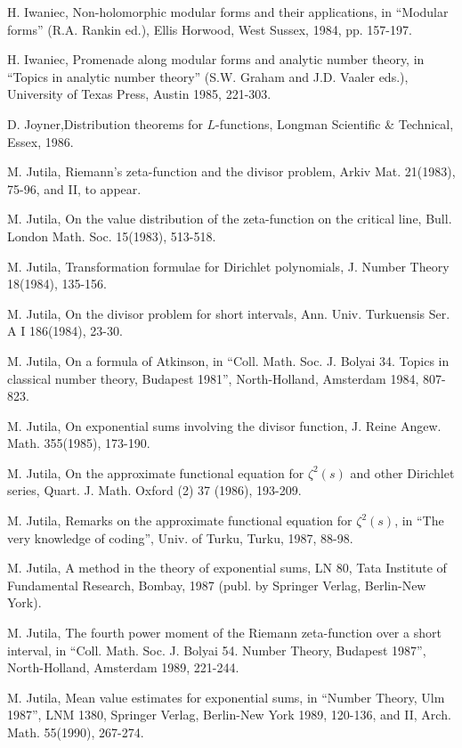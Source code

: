 \begin{thebibliography}{99}
 H. Iwaniec, Non-holomorphic modular forms and their applications, in ``Modular forms'' (R.A. Rankin ed.), Ellis Horwood, West Sussex, 1984, pp. 157-197.

 H. Iwaniec, Promenade along modular forms and analytic number theory, in ``Topics in analytic number theory'' (S.W. Graham and J.D. Vaaler eds.), University of Texas Press, Austin 1985, 221-303.

 D. Joyner,\pageoriginale Distribution theorems for $L$-functions, Longman Scientific \& Technical, Essex, 1986.

 M. Jutila, Riemann's zeta-function and the divisor problem, Arkiv Mat. 21(1983), 75-96, and II, to appear. 

 M. Jutila, On the value distribution of the zeta-function on the critical line, Bull. London Math. Soc. 15(1983), 513-518.

 M. Jutila, Transformation formulae for Dirichlet polynomials, J. Number Theory 18(1984), 135-156.

 M. Jutila, On the divisor problem for short intervals, Ann. Univ. Turkuensis Ser. A I 186(1984), 23-30.

 M. Jutila, On a formula of Atkinson, in ``Coll. Math. Soc. J. Bolyai 34. Topics in classical number theory, Budapest 1981'', North-Holland, Amsterdam 1984, 807-823.

 M. Jutila, On exponential sums involving the divisor function, J. Reine Angew. Math. 355(1985), 173-190.

 M. Jutila, On the approximate functional equation for $\zeta^2(s)$ and other Dirichlet series, Quart. J. Math. Oxford (2) 37 (1986), 193-209.

 M. Jutila, Remarks on the approximate functional equation for $\zeta^2(s)$, in ``The very knowledge of coding'', Univ. of Turku, Turku, 1987, 88-98.

 M. Jutila, A method in the theory of exponential sums, LN 80, Tata Institute of Fundamental Research, Bombay, 1987 (publ. by Springer Verlag, Berlin-New York).

 M. Jutila, The fourth power moment of the Riemann zeta-function over a short interval, in ``Coll. Math. Soc. J. Bolyai 54. Number Theory, Budapest 1987'', North-Holland, Amsterdam 1989, 221-244.

 M. Jutila, Mean value estimates for exponential sums, in ``Number Theory, Ulm 1987'', LNM 1380, Springer Verlag, Berlin-New York 1989, 120-136, and II, Arch. Math. 55(1990), 267-274.


\end{thebibliography}
